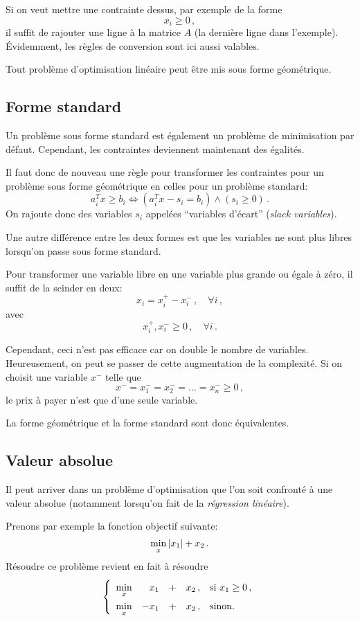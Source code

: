 	Si on veut mettre une contrainte dessus, par exemple de la forme
	\[
	x_i \ge 0\,,
	\]
	il suffit de rajouter une ligne à la matrice $A$
	(la dernière ligne dans l'exemple).
	Évidemment, les règles de conversion sont ici aussi valables.

	Tout problème d'optimisation linéaire
	peut être mis sous forme géométrique.

\subsection{Forme standard}

	Un problème sous forme standard est également
	un problème de minimisation par défaut.
	Cependant, les contraintes deviennent maintenant des égalités.

	Il faut donc de nouveau une règle
	pour transformer les contraintes
	pour un problème sous forme géométrique
	en celles pour un problème standard:
	\[
	a_i^T x \ge b_i \iff \left(a_i^T x - s_i = b_i\right) \land \left(s_i \ge 0\right)\,.
	\]
	On rajoute donc des variables $s_i$ appelées
	``variables d'écart'' (\emph{slack variables}).

	Une autre différence entre les deux formes est
	que les variables ne sont plus libres
	lorsqu'on passe sous forme standard.

	Pour transformer une variable libre
	en une variable plus grande ou égale à zéro,
	il suffit de la scinder en deux:
	\[
	x_i = x_i^+ - x_i^-\,, \quad \forall i\,,
	\]
	avec
	\[
	x_i^+, x_i^- \ge 0\,, \quad \forall i\,.
	\]

	Cependant, ceci n'est pas efficace
	car on double le nombre de variables.
	Heureusement, on peut se passer de cette augmentation de la complexité.
	Si on choisit une variable $x^-$ telle que
	\[
	x^- = x_1^- = x_2^- = \dots = x_n^- \ge 0\,,
	\]
	le prix à payer n'est que d'une seule variable.

	La forme géométrique et la forme standard sont donc équivalentes.

\subsection{Valeur absolue}

	Il peut arriver dans un problème d'optimisation
	que l'on soit confronté à une valeur absolue
	(notamment lorsqu'on fait de la \emph{régression linéaire}).

	Prenons par exemple la fonction objectif suivante:
	\[
	\min_x \left\lvert x_1\right\lvert + x_2\,.
	\]
	Résoudre ce problème revient en fait à résoudre
	\[
	\left\{
	\renewcommand{\arraystretch}{1.5}
	\begin{array}{c@{\quad} r c r@{\quad} l}
		\min\limits_x & x_1 & + & x_2\,, & \textnormal{si } x_1 \ge 0\,,\\
		\min\limits_x & -x_1 & + & x_2\,, & \textnormal{sinon.}
	\end{array}
	\right.
	\]

